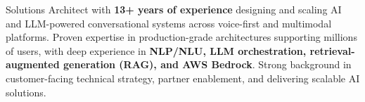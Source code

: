 

Solutions Architect with \textbf{13+ years of experience} designing and scaling AI and LLM-powered conversational systems across voice-first and multimodal platforms. Proven expertise in production-grade architectures supporting millions of users, with deep experience in \textbf{NLP/NLU, LLM orchestration, retrieval-augmented generation (RAG), and AWS Bedrock}. Strong background in customer-facing technical strategy, partner enablement, and delivering scalable AI solutions.
